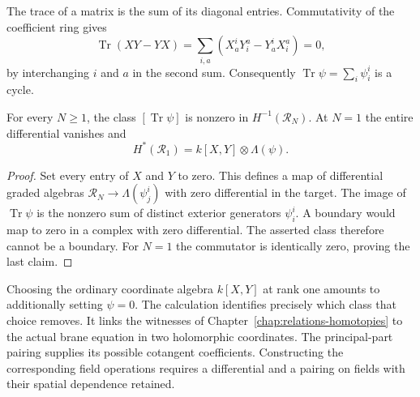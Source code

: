 The trace of a matrix is the sum of its diagonal entries.
Commutativity of the coefficient ring gives
\[
 \operatorname{Tr}(XY-YX)
 =\sum_{i,a}(X^i_aY^a_i-Y^i_aX^a_i)=0,
\]
by interchanging $i$ and $a$ in the second sum.
Consequently $\operatorname{Tr}\psi=\sum_i\psi^i_i$ is a cycle.

\begin{proposition}\label{prop:ocr-scalar-brane-class}
For every $N\ge1$, the class $[\operatorname{Tr}\psi]$ is nonzero
in $H^{-1}(\mathcal R_N)$.
At $N=1$ the entire differential vanishes and
\[
 H^*(\mathcal R_1)=k[X,Y]\otimes\Lambda(\psi).
\]
\end{proposition}

\begin{proof}
Set every entry of $X$ and $Y$ to zero.
This defines a map of differential graded algebras
$\mathcal R_N\to\Lambda(\psi^i_j)$ with zero differential in the
target. The image of $\operatorname{Tr}\psi$ is the nonzero sum
of distinct exterior generators $\psi^i_i$.
A boundary would map to zero in a complex with zero differential.
The asserted class therefore cannot be a boundary.
For $N=1$ the commutator is identically zero, proving the last claim.
\end{proof}

Choosing the ordinary coordinate algebra $k[X,Y]$ at rank one
amounts to additionally setting $\psi=0$.
The calculation identifies precisely which class that choice removes.
It links the witnesses of Chapter~\ref{chap:relations-homotopies}
to the actual brane equation in two holomorphic coordinates.
The principal-part pairing supplies its possible cotangent
coefficients. Constructing the corresponding field operations requires
a differential and a pairing on fields with their spatial dependence
retained.
